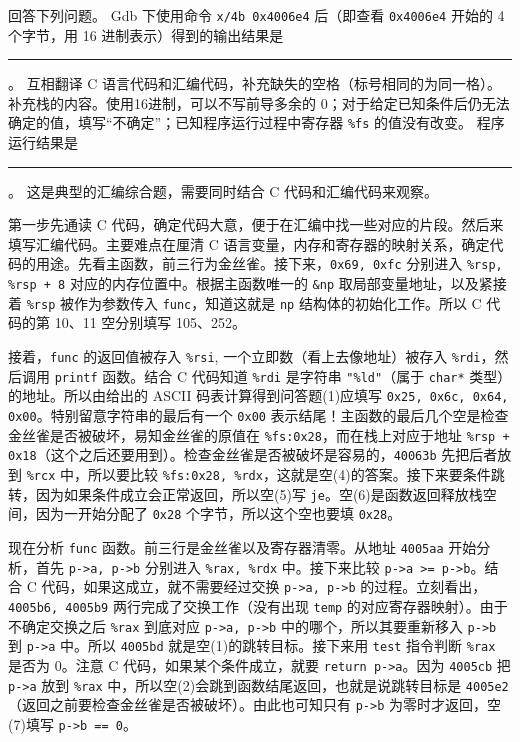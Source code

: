 \begin{problems}
        回答下列问题。
            \qn Gdb 下使用命令 \verb|x/4b 0x4006e4| 后（即查看 \verb|0x4006e4| 开始的 4 个字节，用 16 进制表示）得到的输出结果是 \rule{2.5cm}{0.25mm}。
            \qn 互相翻译 C 语言代码和汇编代码，补充缺失的空格（标号相同的为同一格）。
            \qn 补充栈的内容。使用16进制，可以不写前导多余的 0；对于给定已知条件后仍无法确定的值，填写“不确定”；已知程序运行过程中寄存器 \verb|%fs| 的值没有改变。
            \qn 程序运行结果是 \rule{2.5cm}{0.25mm}。
        \sol 这是典型的汇编综合题，需要同时结合 C 代码和汇编代码来观察。
        
        第一步先通读 C 代码，确定代码大意，便于在汇编中找一些对应的片段。然后来填写汇编代码。主要难点在厘清 C 语言变量，内存和寄存器的映射关系，确定代码的用途。先看主函数，前三行为金丝雀。接下来，\verb|0x69, 0xfc| 分别进入 \verb|%rsp, %rsp + 8| 对应的内存位置中。根据主函数唯一的 \verb|&np| 取局部变量地址，以及紧接着 \verb|%rsp| 被作为参数传入 \verb|func|，知道这就是 \verb|np| 结构体的初始化工作。所以 C 代码的第 10、11 空分别填写 105、252。

        接着，\verb|func| 的返回值被存入 \verb|%rsi|, 一个立即数（看上去像地址）被存入 \verb|%rdi|，然后调用 \verb|printf| 函数。结合 C 代码知道 \verb|%rdi| 是字符串 \verb|"%ld"|（属于 \verb|char*| 类型）的地址。所以由给出的 ASCII 码表计算得到问答题(1)应填写 \verb|0x25, 0x6c, 0x64, 0x00|。特别留意字符串的最后有一个 \verb|0x00| 表示结尾！主函数的最后几个空是检查金丝雀是否被破坏，易知金丝雀的原值在 \verb|%fs:0x28|，而在栈上对应于地址 \verb|%rsp + 0x18|（这个之后还要用到）。检查金丝雀是否被破坏是容易的，\verb|40063b| 先把后者放到 \verb|%rcx| 中，所以要比较 \verb|%fs:0x28, %rdx|，这就是空(4)的答案。接下来要条件跳转，因为如果条件成立会正常返回，所以空(5)写 \verb|je|。空(6)是函数返回释放栈空间，因为一开始分配了 \verb|0x28| 个字节，所以这个空也要填 \verb|0x28|。

        现在分析 \verb|func| 函数。前三行是金丝雀以及寄存器清零。从地址 \verb|4005aa| 开始分析，首先 \verb|p->a, p->b| 分别进入 \verb|%rax, %rdx| 中。接下来比较 \verb|p->a >= p->b|。结合 C 代码，如果这成立，就不需要经过交换 \verb|p->a, p->b| 的过程。立刻看出，\verb|4005b6, 4005b9| 两行完成了交换工作（没有出现 \verb|temp| 的对应寄存器映射）。由于不确定交换之后 \verb|%rax| 到底对应 \verb|p->a, p->b| 中的哪个，所以其要重新移入 \verb|p->b| 到 \verb|p->a| 中。所以 \verb|4005bd| 就是空(1)的跳转目标。接下来用 \verb|test| 指令判断 \verb|%rax| 是否为 0。注意 C 代码，如果某个条件成立，就要 \verb|return p->a|。因为 \verb|4005cb| 把 \verb|p->a| 放到 \verb|%rax| 中，所以空(2)会跳到函数结尾返回，也就是说跳转目标是 \verb|4005e2|（返回之前要检查金丝雀是否被破坏）。由此也可知只有 \verb|p->b| 为零时才返回，空(7)填写 \verb|p->b == 0|。


\end{problems}
